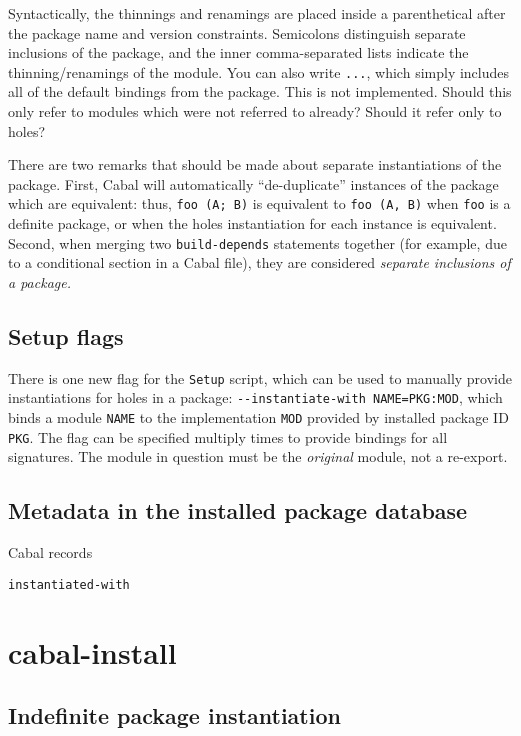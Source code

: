 \documentclass{article}
\newcommand{\Red}[1]{{\color{red} #1}}
\begin{document}
Syntactically, the thinnings and renamings are placed inside a
parenthetical after the package name and version constraints.
Semicolons distinguish separate inclusions of the package, and the inner
comma-separated lists indicate the thinning/renamings of the module.
You can also write \verb|...|, which simply
includes all of the default bindings from the package.
\Red{This is not implemented. Should this only refer to modules which were not referred to already? Should it refer only to holes?}

There are two remarks that should be made about separate instantiations of
the package.  First, Cabal will automatically ``de-duplicate'' instances of
the package which are equivalent: thus, \verb|foo (A; B)| is equivalent to
\texttt{foo (A, B)} when \texttt{foo} is a definite package, or when the
holes instantiation for each instance is equivalent.  Second, when merging
two \texttt{build-depends} statements together (for example, due to
a conditional section in a Cabal file), they are considered \emph{separate
inclusions of a package.}

\subsection{Setup flags}

There is one new flag for the \texttt{Setup} script, which can be
used to manually provide instantiations for holes in a package:
\verb|--instantiate-with NAME=PKG:MOD|, which binds a module \verb|NAME|
to the implementation \verb|MOD| provided by installed package ID \verb|PKG|.
The flag can be specified multiply times to provide bindings for all
signatures.  The module in question must be the \emph{original} module,
not a re-export.



\subsection{Metadata in the installed package database}

Cabal records

\texttt{instantiated-with}

\section{cabal-install}

\subsection{Indefinite package instantiation}
\end{document}
